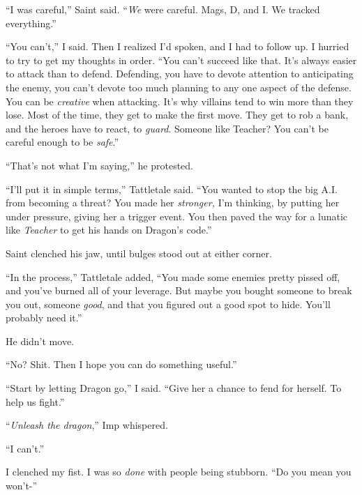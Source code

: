``I was careful,'' Saint said.  ``\emph{We} were careful.  Mags, D, and I.  We tracked everything.''



``You can't,'' I said.  Then I realized I'd spoken, and I had to follow up.  I hurried to try to get my thoughts in order.  ``You can't succeed like that.  It's always easier to attack than to defend.  Defending, you have to devote attention to anticipating the enemy, you can't devote too much planning to any one aspect of the defense.  You can be \emph{creative} when attacking.  It's why villains tend to win more than they lose.  Most of the time, they get to make the first move.  They get to rob a bank, and the heroes have to react, to \emph{guard}.  Someone like Teacher?  You can't be careful enough to be \emph{safe}.''



``That's not what I'm saying,'' he protested.



``I'll put it in simple terms,'' Tattletale said.  ``You wanted to stop the big A.I. from becoming a threat?  You made her \emph{stronger, }I'm thinking, by putting her under pressure, giving her a trigger event.  You then paved the way for a lunatic like \emph{Teacher }to get his hands on Dragon's code.''



Saint clenched his jaw, until bulges stood out at either corner.



``In the process,'' Tattletale added, ``You made some enemies pretty pissed off, and you've burned all of your leverage.  But maybe you bought someone to break you out, someone \emph{good}, and that you figured out a good spot to hide.  You'll probably need it.''



He didn't move.



``No?  Shit.  Then I hope you can do something useful.''



``Start by letting Dragon go,'' I said.  ``Give her a chance to fend for herself.  To help us fight.''



``\emph{Unleash the dragon},'' Imp whispered.



``I can't.''



I clenched my fist.  I was so \emph{done} with people being stubborn.  ``Do you mean you won't-''



